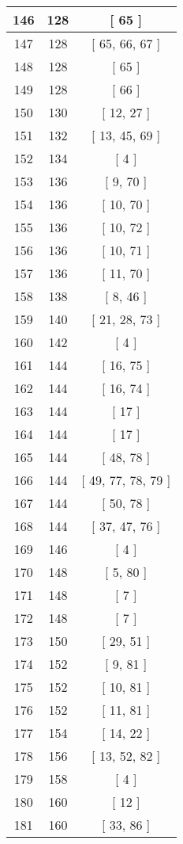 \begin{center}
\begin{longtable}[H]{|| c c c ||}
\hline
146 & 128 & [ 65 ] \\ 
\hline
147 & 128 & [ 65, 66, 67 ] \\ 
\hline
148 & 128 & [ 65 ] \\ 
\hline
149 & 128 & [ 66 ] \\ 
\hline
150 & 130 & [ 12, 27 ] \\ 
\hline
151 & 132 & [ 13, 45, 69 ] \\ 
\hline
152 & 134 & [ 4 ] \\ 
\hline
153 & 136 & [ 9, 70 ] \\ 
\hline
154 & 136 & [ 10, 70 ] \\ 
\hline
155 & 136 & [ 10, 72 ] \\ 
\hline
156 & 136 & [ 10, 71 ] \\ 
\hline
157 & 136 & [ 11, 70 ] \\ 
\hline
158 & 138 & [ 8, 46 ] \\ 
\hline
159 & 140 & [ 21, 28, 73 ] \\ 
\hline
160 & 142 & [ 4 ] \\ 
\hline
161 & 144 & [ 16, 75 ] \\ 
\hline
162 & 144 & [ 16, 74 ] \\ 
\hline
163 & 144 & [ 17 ] \\ 
\hline
164 & 144 & [ 17 ] \\ 
\hline
165 & 144 & [ 48, 78 ] \\ 
\hline
166 & 144 & [ 49, 77, 78, 79 ] \\ 
\hline
167 & 144 & [ 50, 78 ] \\ 
\hline
168 & 144 & [ 37, 47, 76 ] \\ 
\hline
169 & 146 & [ 4 ] \\ 
\hline
170 & 148 & [ 5, 80 ] \\ 
\hline
171 & 148 & [ 7 ] \\ 
\hline
172 & 148 & [ 7 ] \\ 
\hline
173 & 150 & [ 29, 51 ] \\ 
\hline
174 & 152 & [ 9, 81 ] \\ 
\hline
175 & 152 & [ 10, 81 ] \\ 
\hline
176 & 152 & [ 11, 81 ] \\ 
\hline
177 & 154 & [ 14, 22 ] \\ 
\hline
178 & 156 & [ 13, 52, 82 ] \\ 
\hline
179 & 158 & [ 4 ] \\ 
\hline
180 & 160 & [ 12 ] \\ 
\hline
181 & 160 & [ 33, 86 ] \\ 

\end{longtable}
\end{center}
